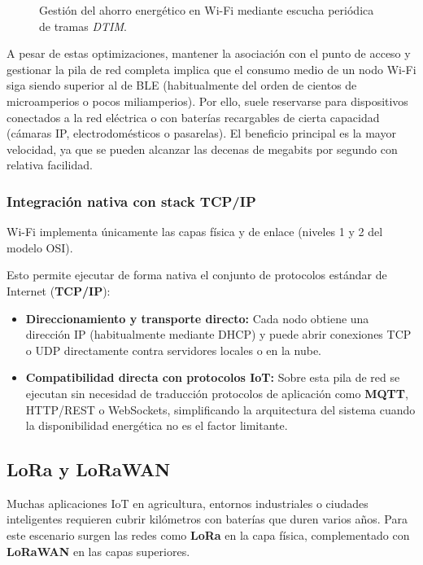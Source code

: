 \documentclass[../main.tex]{subfiles}
\begin{document}
\begin{figure}[h]
\begin{tikzpicture}
                    \end{tikzpicture}
                    \caption{Gestión del ahorro energético en Wi-Fi mediante escucha periódica de tramas \emph{DTIM}.}
                    \label{fig:wifi_psm}
                \end{figure}

                A pesar de estas optimizaciones, mantener la asociación con el punto de acceso y gestionar la pila de red completa implica que el consumo medio de un nodo Wi-Fi siga siendo superior al de BLE (habitualmente del orden de cientos de microamperios o pocos miliamperios). Por ello, suele reservarse para dispositivos conectados a la red eléctrica o con baterías recargables de cierta capacidad (cámaras IP, electrodomésticos o pasarelas). El beneficio principal es la mayor velocidad, ya que se pueden alcanzar las decenas de megabits por segundo con relativa facilidad.

            \subsubsection{Integración nativa con stack TCP/IP}
                Wi-Fi implementa únicamente las capas física y de enlace (niveles 1 y 2 del modelo OSI).

                Esto permite ejecutar de forma nativa el conjunto de protocolos estándar de Internet (\textbf{TCP/IP}):
                \begin{itemize}
                    \item \textbf{Direccionamiento y transporte directo:} Cada nodo obtiene una dirección IP (habitualmente mediante DHCP) y puede abrir conexiones TCP o UDP directamente contra servidores locales o en la nube.
                    \item \textbf{Compatibilidad directa con protocolos IoT:} Sobre esta pila de red se ejecutan sin necesidad de traducción protocolos de aplicación como \textbf{MQTT}, HTTP/REST o WebSockets, simplificando la arquitectura del sistema cuando la disponibilidad energética no es el factor limitante.
                \end{itemize}

        \subsection{LoRa y LoRaWAN}

            Muchas aplicaciones IoT en agricultura, entornos industriales o ciudades inteligentes requieren cubrir kilómetros con baterías que duren varios años. Para este escenario surgen las redes como \textbf{LoRa} en la capa física, complementado con \textbf{LoRaWAN} en las capas superiores. 
\end{document}
